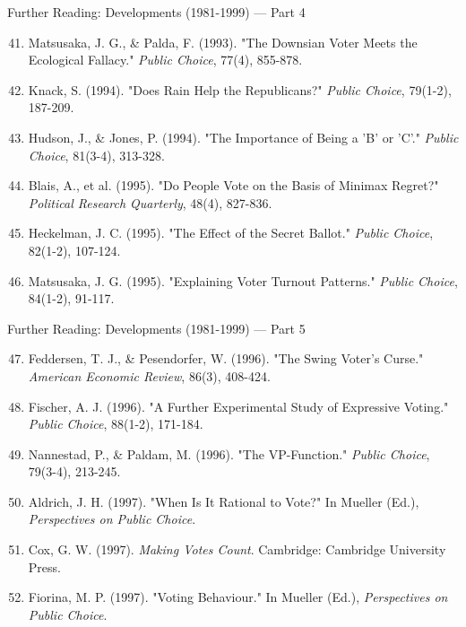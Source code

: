 \documentclass[10pt]{beamer}
\begin{document}
\begin{frame}{Further Reading: Developments (1981-1999) — Part 4}
\footnotesize
\begin{enumerate}
\setcounter{enumi}{40}
\item Matsusaka, J. G., \& Palda, F. (1993). "The Downsian Voter Meets the Ecological Fallacy." \emph{Public Choice}, 77(4), 855-878.
\item Knack, S. (1994). "Does Rain Help the Republicans?" \emph{Public Choice}, 79(1-2), 187-209.
\item Hudson, J., \& Jones, P. (1994). "The Importance of Being a 'B' or 'C'." \emph{Public Choice}, 81(3-4), 313-328.
\item Blais, A., et al. (1995). "Do People Vote on the Basis of Minimax Regret?" \emph{Political Research Quarterly}, 48(4), 827-836.
\item Heckelman, J. C. (1995). "The Effect of the Secret Ballot." \emph{Public Choice}, 82(1-2), 107-124.
\item Matsusaka, J. G. (1995). "Explaining Voter Turnout Patterns." \emph{Public Choice}, 84(1-2), 91-117.
\end{enumerate}
\end{frame}

\begin{frame}{Further Reading: Developments (1981-1999) — Part 5}
\footnotesize
\begin{enumerate}
\setcounter{enumi}{46}
\item Feddersen, T. J., \& Pesendorfer, W. (1996). "The Swing Voter's Curse." \emph{American Economic Review}, 86(3), 408-424.
\item Fischer, A. J. (1996). "A Further Experimental Study of Expressive Voting." \emph{Public Choice}, 88(1-2), 171-184.
\item Nannestad, P., \& Paldam, M. (1996). "The VP-Function." \emph{Public Choice}, 79(3-4), 213-245.
\item Aldrich, J. H. (1997). "When Is It Rational to Vote?" In Mueller (Ed.), \emph{Perspectives on Public Choice}.
\item Cox, G. W. (1997). \emph{Making Votes Count}. Cambridge: Cambridge University Press.
\item Fiorina, M. P. (1997). "Voting Behaviour." In Mueller (Ed.), \emph{Perspectives on Public Choice}.
\end{enumerate}
\end{frame}
\end{document}

